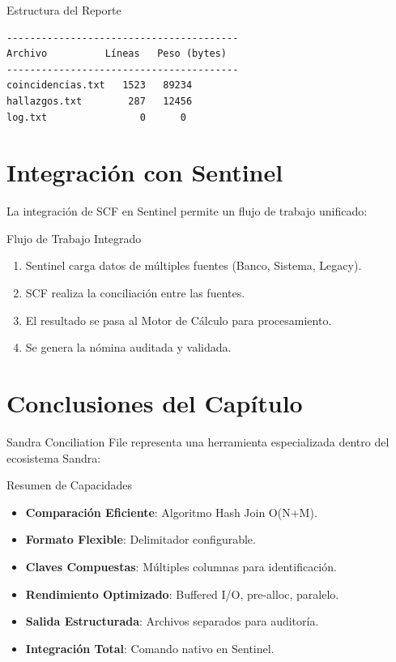 \begin{caja}{Estructura del Reporte}
\begin{verbatim}
----------------------------------------
Archivo          Líneas   Peso (bytes)
----------------------------------------
coincidencias.txt   1523   89234
hallazgos.txt        287   12456
log.txt                0      0
\end{verbatim}
\end{caja}


\section{Integración con Sentinel}

La integración de SCF en Sentinel permite un flujo de trabajo unificado:

\begin{caja}{Flujo de Trabajo Integrado}
\begin{enumerate}
\item Sentinel carga datos de múltiples fuentes (Banco, Sistema, Legacy).
\item SCF realiza la conciliación entre las fuentes.
\item El resultado se pasa al Motor de Cálculo para procesamiento.
\item Se genera la nómina auditada y validada.
\end{enumerate}
\end{caja}


\section{Conclusiones del Capítulo}

Sandra Conciliation File representa una herramienta especializada dentro del ecosistema Sandra:

\begin{caja}{Resumen de Capacidades}
\begin{itemize}
\item \textbf{Comparación Eficiente}: Algoritmo Hash Join O(N+M).
\item \textbf{Formato Flexible}: Delimitador configurable.
\item \textbf{Claves Compuestas}: Múltiples columnas para identificación.
\item \textbf{Rendimiento Optimizado}: Buffered I/O, pre-alloc, paralelo.
\item \textbf{Salida Estructurada}: Archivos separados para auditoría.
\item \textbf{Integración Total}: Comando nativo en Sentinel.
\end{itemize}
\end{caja}

